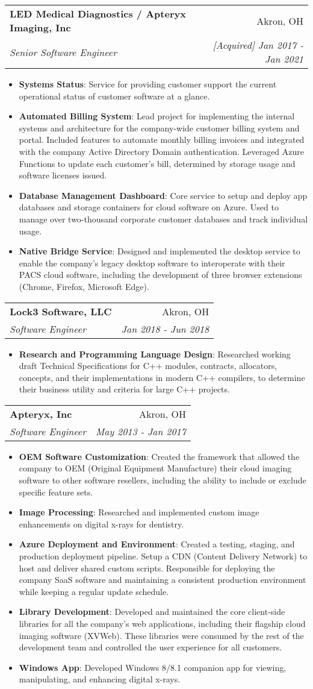 \documentclass[letterpaper,11pt]{article}
\makeatletter
\newcommand{\resumeItem}[2]{
  \item\small{
    \textbf{#1}{: #2 \vspace{-2pt}}
  }
}
\newcommand{\resumeSubheading}[4]{
  \vspace{-1pt}\item
    \begin{tabular*}{0.97\textwidth}[t]{l@{\extracolsep{\fill}}r}
      \textbf{#1} & #2 \\
      \textit{\small#3} & \textit{\small #4} \\
    \end{tabular*}\vspace{-5pt}
}
\newcommand{\resumeItemListStart}{\begin{itemize}}
\newcommand{\resumeItemListEnd}{\end{itemize}\vspace{-5pt}}
\makeatother
\begin{document}
    \resumeSubheading
      {LED Medical Diagnostics / Apteryx Imaging, Inc}{Akron, OH}
      {Senior Software Engineer}{[Acquired] Jan 2017 - Jan 2021}
      \resumeItemListStart
        \resumeItem{Systems Status}
          {Service for providing customer support the current operational status of customer software at a glance.}
        \resumeItem{Automated Billing System}
          {Lead project for implementing the internal systems and architecture for the company-wide customer billing system and portal. Included features to automate monthly billing invoices and integrated with the company Active Directory Domain authentication. Leveraged Azure Functions to update each customer's bill, determined by storage usage and software licenses issued.}
        \resumeItem{Database Management Dashboard}
          {Core service to setup and deploy app databases and storage containers for cloud software on Azure. Used to manage over two-thousand corporate customer databases and track individual usage.}
        \resumeItem{Native Bridge Service}
          {Designed and implemented the desktop service to enable the company's legacy desktop software to interoperate with their PACS cloud software, including the development of three browser extensions (Chrome, Firefox, Microsoft Edge).}
      \resumeItemListEnd
      
    \resumeSubheading
      {Lock3 Software, LLC}{Akron, OH}
      {Software Engineer}{Jan 2018 - Jun 2018}
      \resumeItemListStart
        \resumeItem{Research and Programming Language Design}
          {Researched working draft Technical Specifications for C++ modules, contracts, allocators, concepts, and their implementations in modern C++ compilers, to determine their business utility and criteria for large C++ projects.}
      \resumeItemListEnd

    \resumeSubheading
      {Apteryx, Inc}{Akron, OH}
      {Software Engineer}{May 2013 - Jan 2017}
      \resumeItemListStart
        \resumeItem{OEM Software Customization}
          {Created the framework that allowed the company to OEM (Original Equipment Manufacture) their cloud imaging software to other software resellers, including the ability to include or exclude specific feature sets.}
        \resumeItem{Image Processing}
          {Researched and implemented custom image enhancements on digital x-rays for dentistry.}
        \resumeItem{Azure Deployment and Environment}
          {Created a testing, staging, and production deployment pipeline. Setup a CDN (Content Delivery Network) to host and deliver shared custom scripts. Responsible for deploying the company SaaS software and maintaining a consistent production environment while keeping a regular update schedule.}
        \resumeItem{Library Development}
          {Developed and maintained the core client-side libraries for all the company's web applications, including their flagship cloud imaging software (\footnotesize{XVWeb}). \small{These libraries were consumed by the rest of the development team and controlled the user experience for all customers.}}
        \resumeItem{Windows App}
          {Developed Windows 8/8.1 companion app for viewing, manipulating, and enhancing digital x-rays.}
      \resumeItemListEnd
\end{document}
